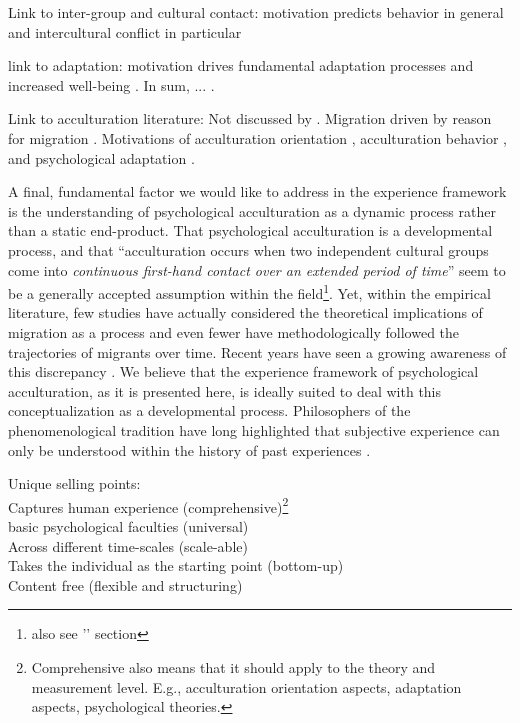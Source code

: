 \documentclass[nobib]{tufte-handout}
\begin{document}
Link to inter-group and cultural contact: motivation predicts behavior in general \citep{Kitayama2007} and intercultural conflict in particular \citep{Hassler2021, Shnabel2008a}

link to adaptation: motivation drives fundamental adaptation processes \citep{Dignath2020} and increased well-being \citep{Steverink2006}. 
In sum, ... .

Link to acculturation literature: Not discussed by \citep{Ward2001a, Ward2019}. Migration driven by reason for migration \citep{Sandu2018}. Motivations of acculturation orientation \citep{Recker2017a}, acculturation behavior \citep{Reece2000}, and psychological adaptation \citep{Safdar2003}. 

A final, fundamental factor we would like to address in the experience framework is the understanding of psychological acculturation as a dynamic process rather than a static end-product. That psychological acculturation is a developmental process, and that ``acculturation occurs when two independent cultural groups come into \textit{continuous first-hand contact over an extended period of time}'' \citep[][186]{Berry1989} seem to be a generally accepted assumption within the field\footnote{also see '' section}. Yet, within the empirical literature, few studies have actually considered the theoretical implications of migration as a process and even fewer have methodologically followed the trajectories of migrants over time. Recent years have seen a growing awareness of this discrepancy \citep[e.g.,][]{Brown2011, Ward2019}. We believe that the experience framework of psychological acculturation, as it is presented here, is ideally suited to deal with this conceptualization as a developmental process. Philosophers of the phenomenological tradition have long highlighted that subjective experience can only be understood within the history of past experiences \citep[e.g.,][]{Heidegger1867}. 

 Unique selling points:\\
Captures human experience (comprehensive)\footnote{Comprehensive also means that it should apply to the theory and measurement level. E.g., acculturation orientation aspects, adaptation aspects, psychological theories.}\\
basic psychological faculties (universal)\\
Across different time-scales (scale-able)\\
Takes the individual as the starting point (bottom-up)\\
Content free (flexible and structuring)
\end{document}
